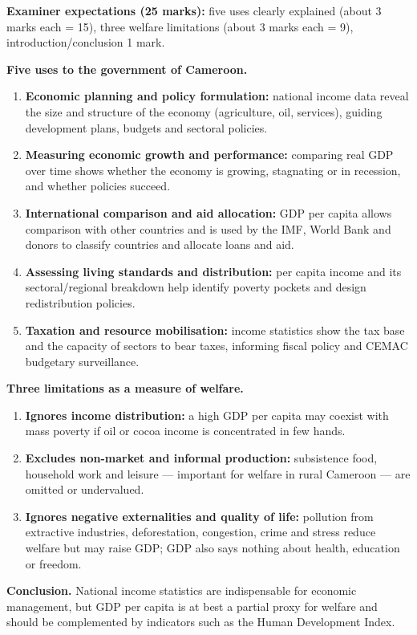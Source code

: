 \documentclass[11pt]{article}
\begin{document}
\begin{corrige}
\textbf{Examiner expectations (25 marks):} five uses clearly explained (about 3 marks each = 15), three welfare limitations (about 3 marks each = 9), introduction/conclusion 1 mark.

\textbf{Five uses to the government of Cameroon.}
\begin{enumerate}
\item \textbf{Economic planning and policy formulation:} national income data reveal the size and structure of the economy (agriculture, oil, services), guiding development plans, budgets and sectoral policies.
\item \textbf{Measuring economic growth and performance:} comparing real GDP over time shows whether the economy is growing, stagnating or in recession, and whether policies succeed.
\item \textbf{International comparison and aid allocation:} GDP per capita allows comparison with other countries and is used by the IMF, World Bank and donors to classify countries and allocate loans and aid.
\item \textbf{Assessing living standards and distribution:} per capita income and its sectoral/regional breakdown help identify poverty pockets and design redistribution policies.
\item \textbf{Taxation and resource mobilisation:} income statistics show the tax base and the capacity of sectors to bear taxes, informing fiscal policy and CEMAC budgetary surveillance.
\end{enumerate}

\textbf{Three limitations as a measure of welfare.}
\begin{enumerate}
\item \textbf{Ignores income distribution:} a high GDP per capita may coexist with mass poverty if oil or cocoa income is concentrated in few hands.
\item \textbf{Excludes non-market and informal production:} subsistence food, household work and leisure — important for welfare in rural Cameroon — are omitted or undervalued.
\item \textbf{Ignores negative externalities and quality of life:} pollution from extractive industries, deforestation, congestion, crime and stress reduce welfare but may raise GDP; GDP also says nothing about health, education or freedom.
\end{enumerate}

\textbf{Conclusion.} National income statistics are indispensable for economic management, but GDP per capita is at best a partial proxy for welfare and should be complemented by indicators such as the Human Development Index.
\end{corrige}
\end{document}
